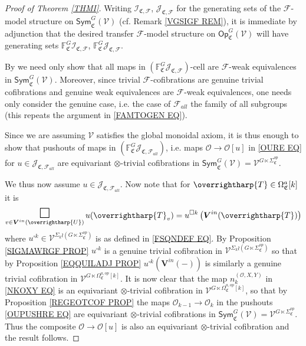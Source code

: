 \documentclass[a4paper,10pt
,draft
]{article}%
\numberwithin{equation}{section}
\numberwithin{figure}{section}
\theoremstyle{definition} %
\newcommand{\vect}[1]{\text{\overrightharp{\ensuremath{#1}}}}
\newcommand{\F}{\ensuremath{\mathcal F}}
\newcommand{\V}{\ensuremath{\mathcal V}}
\renewcommand{\O}{\ensuremath{\mathcal O}}
\newcommand{\1}{\ensuremath{\mathbbm 1}}%
\begin{document}
\begin{proof}[Proof of Theorem \ref{THMI}]    
Writing
$\mathcal{I}_{\mathfrak{C},\mathcal{F}}$,
$\mathcal{J}_{\mathfrak{C},\mathcal{F}}$
for the generating sets
of the $\F$-model structure on 
$\mathsf{Sym}^G_{\mathfrak{C}}(\V)$
(cf. Remark \ref{VGSIGF REM}),
it is immediate by adjunction
that the desired transfer $\F$-model structure
on $\mathsf{Op}^G_{\mathfrak{C}}(\V)$
will have generating sets 
$\mathbb{F}^G_{\mathfrak{C}}\mathcal{I}_{\mathfrak{C},\mathcal{F}}$,
$\mathbb{F}^G_{\mathfrak{C}}\mathcal{J}_{\mathfrak{C},\mathcal{F}}$.
	 
By \cite[Thm. 11.3.2]{Hir03} we need only show that
all maps in
$(\mathbb{F}^G_{\mathfrak{C}}\mathcal{J}_{\mathfrak{C},\mathcal{F}})$-cell
are $\F$-weak equivalences in $\mathsf{Sym}^G_{\mathfrak{C}}(\V)$.
Moreover, since trivial $\F$-cofibrations are genuine trivial cofibrations and 
genuine weak equivalences are $\F$-weak equivalences, one needs only consider the genuine case, i.e. the case of $\F_{all}$ the family of all subgroups (this repeats the argument in \eqref{FAMTOGEN EQ}).


Since we are assuming $\V$ satisfies the global monoidal axiom, 
it is thus enough to show that pushouts of maps in 
$(\mathbb{F}^G_{\mathfrak{C}}\mathcal{J}_{\mathfrak{C},\mathcal{F}_{all}})$,
i.e. maps $\O \to \O[u]$ in \eqref{OURE EQ}
for $u \in \mathcal{J}_{\mathfrak{C},\mathcal{F}_{all}}$
are equivariant $\otimes$-trivial cofibrations
in $\mathsf{Sym}^G_{\mathfrak{C}}(\V) = \V^{G \ltimes \Sigma^{op}_{\mathfrak{C}}}$.



We thus now assume $u \in \mathcal{J}_{\mathfrak{C},\mathcal{F}_{all}}$.
Now note that for $\vect{T} \in \Omega^a_{\mathfrak{C}}[k]$
it is
\[
	\mathop{\mathlarger{\mathlarger{\mathlarger{\square}}}}\limits_{v \in \boldsymbol{V}^{in}(\vect{U})} u(\vect{T}_v)
=
	u^{\square k}\left( \boldsymbol{V}^{in}(\vect T) \right)
\]
where
$u^{\square k} \in 
\V^{\Sigma_k \wr (G \ltimes \Sigma^{op}_{\mathfrak{C}})}$
is as defined in \eqref{FSQNDEF EQ}.
By Proposition \eqref{SIGMAWRGF PROP}
$u^{\square k}$ is a genuine trivial cofibration in 
$\V^{\Sigma_k \wr (G \ltimes \Sigma^{op}_{\mathfrak{C}})}$
so that by
Proposition \ref{EQQUILADJ PROP}
$u^{\square k}(\boldsymbol{V}^{in}(-))$
is similarly a genuine trivial cofibration in 
$\V^{G \ltimes \Omega^{a,op}_{\mathfrak{C}}[k]}$.
It is now clear that
the map $n_k^{(\O,X,Y)}$ in \eqref{NKOXY EQ}
is an equivariant
$\otimes$-trivial cofibration in 
$\V^{G \ltimes \Omega^{a,op}_{\mathfrak{C}}[k]}$,
so that by 
Proposition \ref{REGEOTCOF PROP}
the maps $\O_{k-1} \to \O_{k}$
in the pushouts \eqref{OUPUSHRE EQ}
are equivariant $\otimes$-trivial cofibrations
in 
$\mathsf{Sym}^G_{\mathfrak{C}}(\V)
= \V^{G\ltimes \Sigma^{op}_{\mathfrak{C}}}$.
Thus the composite $\O \to \O[u]$
is also an
equivariant $\otimes$-trivial cofibration
and the result follows.
\end{proof}
\end{document}
